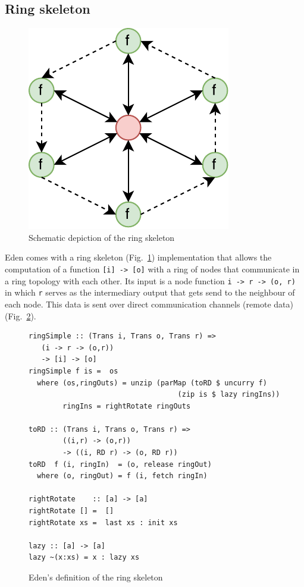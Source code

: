 \documentclass{jfp1}
\newcommand{\inlinecode}[1]{\texttt{#1}}
\begin{document}
\subsection{Ring skeleton} \label{sec:ring}
\begin{figure}[h]
	\includegraphics[scale=0.75]{images/ring}
	\caption{Schematic depiction of the ring skeleton}
	\label{fig:ringImg}
\end{figure}
Eden comes with a ring skeleton (Fig.~\ref{fig:ringImg}) implementation that allows the computation of a function \inlinecode{[i] -> [o]} with a ring of nodes that communicate in a ring topology with each other. Its input is a node function \inlinecode{i -> r -> (o, r)} in which \inlinecode{r} serves as the intermediary output that gets send to the neighbour of each node. This data is sent over direct communication channels (remote data) (Fig.~\ref{fig:ringEden}).
\begin{figure}[h]
\begin{lstlisting}[frame=htrbl]
ringSimple :: (Trans i, Trans o, Trans r) =>
   (i -> r -> (o,r))
   -> [i] -> [o]
ringSimple f is =  os
  where (os,ringOuts) = unzip (parMap (toRD $ uncurry f)
                                   (zip is $ lazy ringIns))
        ringIns = rightRotate ringOuts

toRD :: (Trans i, Trans o, Trans r) =>
        ((i,r) -> (o,r))
        -> ((i, RD r) -> (o, RD r))
toRD  f (i, ringIn)  = (o, release ringOut)
  where (o, ringOut) = f (i, fetch ringIn)

rightRotate    :: [a] -> [a]
rightRotate [] =  []
rightRotate xs =  last xs : init xs

lazy :: [a] -> [a]
lazy ~(x:xs) = x : lazy xs
\end{lstlisting}
\caption{Eden's definition of the ring skeleton \citep{eden_skel_topology}}
\label{fig:ringEden}
\end{figure}
\end{document}
